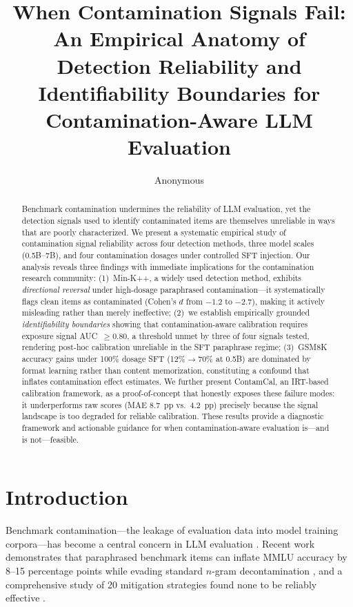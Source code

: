 \documentclass[11pt]{article}
\title{When Contamination Signals Fail: An Empirical Anatomy of Detection Reliability and Identifiability Boundaries for Contamination-Aware LLM Evaluation}
\author{Anonymous}
\date{}
\begin{document}
\maketitle

\begin{abstract}
Benchmark contamination undermines the reliability of LLM evaluation, yet the detection signals used to identify contaminated items are themselves unreliable in ways that are poorly characterized.
We present a systematic empirical study of contamination signal reliability across four detection methods, three model scales (0.5B--7B), and four contamination dosages under controlled SFT injection.
Our analysis reveals three findings with immediate implications for the contamination research community:
(1)~Min-K++, a widely used detection method, exhibits \emph{directional reversal} under high-dosage paraphrased contamination---it systematically flags clean items as contaminated (Cohen's $d$ from $-1.2$ to $-2.7$), making it actively misleading rather than merely ineffective;
(2)~we establish empirically grounded \emph{identifiability boundaries} showing that contamination-aware calibration requires exposure signal AUC~$\geq 0.80$, a threshold unmet by three of four signals tested, rendering post-hoc calibration unreliable in the SFT paraphrase regime;
(3)~GSM8K accuracy gains under 100\% dosage SFT (12\%$\to$70\% at 0.5B) are dominated by format learning rather than content memorization, constituting a confound that inflates contamination effect estimates.
We further present ContamCal, an IRT-based calibration framework, as a proof-of-concept that honestly exposes these failure modes: it underperforms raw scores (MAE 8.7~pp vs.\ 4.2~pp) precisely because the signal landscape is too degraded for reliable calibration.
These results provide a diagnostic framework and actionable guidance for when contamination-aware evaluation is---and is not---feasible.
\end{abstract}

\section{Introduction}

Benchmark contamination---the leakage of evaluation data into model training corpora---has become a central concern in LLM evaluation \citep{sainz2023chatgpt,jacovi2023stop,yang2023rethinking,deng2024investigating}.
Recent work demonstrates that paraphrased benchmark items can inflate MMLU accuracy by 8--15 percentage points while evading standard $n$-gram decontamination \citep{yang2023rethinking,oren2024proving}, and a comprehensive study of 20 mitigation strategies found none to be reliably effective \citep{xu2024benchmarking}.
\end{document}
